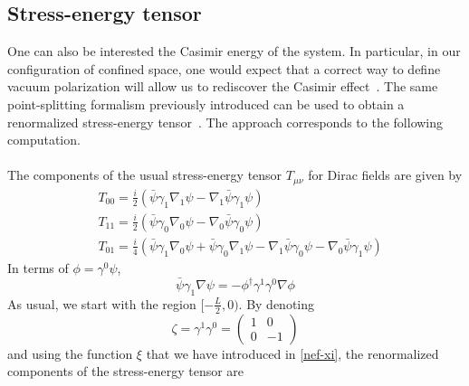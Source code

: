 \subsection{Stress-energy tensor}
One can also be interested the Casimir energy of the system.
In particular, in our configuration of confined space, one would expect that a correct way to define vacuum polarization will allow us to rediscover the Casimir effect~\cite{Casimir1948}.
The same point-splitting formalism previously introduced can be used to obtain a renormalized stress-energy tensor~\cite{Dappiaggi2009}.
The approach corresponds to the following computation.
\\\\
The components of the usual stress-energy tensor $T_{\mu\nu}$ for Dirac fields are given by
\begin{equation}
\begin{split}
& T_{00} = \frac{i}{2} (\bar{\psi} \gamma_1 \nabla_1 \psi - \nabla_1 \bar{\psi}\gamma_1 \psi)  \\
& T_{11} = \frac{i}{2} (\bar{\psi} \gamma_0 \nabla_0 \psi - \nabla_0 \bar{\psi}\gamma_0 \psi)  \\
& T_{01} = \frac{i}{4} (\bar{\psi} \gamma_1 \nabla_0 \psi +\bar{\psi} \gamma_0 \nabla_1 \psi - \nabla_1 \bar{\psi}\gamma_0 \psi - \nabla_0 \bar{\psi}\gamma_1 \psi)  
\end{split}
\end{equation}
In terms of $\phi = \gamma^0 \psi$, 
\begin{equation*}
\bar{\psi} \gamma_1 \nabla \psi = - \phi^\dagger \gamma^1 \gamma^0 \nabla \phi
\end{equation*}
As usual, we start with the region $[-\frac{L}{2}, 0)$. By denoting
\begin{equation*}
\zeta = \gamma^1 \gamma^0 = \begin{pmatrix}
1 & 0 \\
0 & -1
\end{pmatrix}
\end{equation*}
and using the function $\xi$ that we have introduced in \cref{nef-xi}, 
the renormalized components of the stress-energy tensor are
